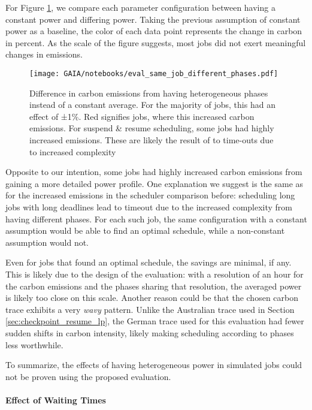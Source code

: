 \newpage
For Figure \ref{fig:different_phases_no_effect_lol}, we compare each parameter configuration between having a constant power and differing power. Taking the previous assumption of constant power as a baseline, the color of each data point represents the change in carbon in percent. As the scale of the figure suggests, most jobs did not exert meaningful changes in emissions. 

\begin{figure}[H]
    \texttt{[image: GAIA/notebooks/eval\_same\_job\_different\_phases.pdf]}
    \caption[short]{Difference in carbon emissions from having heterogeneous phases instead of a constant average. For the majority of jobs, this had an effect of ±1\%. Red signifies jobs, where this increased carbon emissions. For suspend \& resume scheduling, some jobs had highly increased emissions. These are likely the result of to time-outs due to increased complexity}

    \label{fig:different_phases_no_effect_lol}
\end{figure}

Opposite to our intention, some jobs had highly increased carbon emissions from gaining a more detailed power profile.
One explanation we suggest is the same as for the increased emissions in the scheduler comparison before: scheduling long jobs with long deadlines lead to timeout due to the increased complexity from having different phases. 
For each such job, the same configuration with a constant assumption would be able to find an optimal schedule, while a non-constant assumption would not.

Even for jobs that found an optimal schedule, the savings are minimal, if any. 
This is likely due to the design of the evaluation: with a resolution of an hour for the carbon emissions and the phases sharing that resolution, the averaged power is likely too close on this scale. Another reason could be that the chosen carbon trace exhibits a very \emph{wavy} pattern. Unlike the Australian trace used in Section \ref{sec:checkpoint_resume_lp}, the German trace used for this evaluation had fewer sudden shifts in carbon intensity, likely making scheduling according to phases less worthwhile.

To summarize, the effects of having heterogeneous power in simulated jobs could not be proven using the proposed evaluation.

\paragraph{Effect of Waiting Times}

